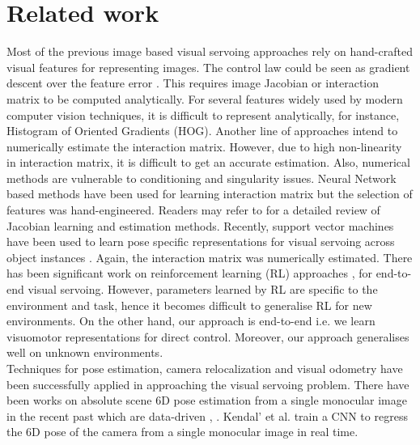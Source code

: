 \documentclass[usletter, 10 pt, conference]{ieeeconf}  %
\begin{document}
\section{Related work}
Most of the previous image based visual servoing approaches rely on hand-crafted visual features for representing images. The control law could be seen as gradient descent over the feature error \cite{photometricvs}. This requires image Jacobian or interaction matrix to be  computed analytically. For several features widely used by modern computer vision techniques, it is difficult to represent analytically, for instance, Histogram of Oriented Gradients (HOG). Another line of approaches intend to numerically estimate the interaction matrix. However, due to high non-linearity in interaction matrix, it is difficult to get an accurate estimation. Also, numerical methods are vulnerable to conditioning and singularity issues. Neural Network based methods have been used for learning interaction matrix but the selection of features was hand-engineered. Readers may refer to \cite{vsadvanced} for a detailed review of Jacobian learning and estimation methods.  Recently, support vector machines have been used to learn pose specific representations for visual servoing across object instances \cite{harit}. Again, the interaction matrix was numerically estimated. There has been significant work on reinforcement learning (RL) approaches \cite{RL1}, \cite{RL2}  for end-to-end visual servoing. However, parameters learned by RL are specific to the environment and task, hence it becomes difficult to generalise RL for new environments. On the other hand, our approach is end-to-end i.e. we learn visuomotor representations for direct control. Moreover, our approach generalises well on unknown environments.\\
\indent Techniques for pose estimation, camera relocalization and visual odometry have been successfully applied in approaching the visual servoing problem.
There have been works on absolute scene 6D pose estimation from a single monocular image in the recent past which are data-driven \cite{brachmannuncertainty}, \cite{kendall2015posenet}. Kendal' et al. \cite{kendall2015posenet} train a CNN
to regress the $6$D pose of the camera from a single monocular image in real time. 
\end{document}
